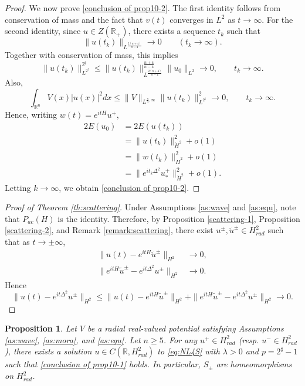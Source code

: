 \documentclass[11pt,a4paper]{article}
\numberwithin{equation}{section}
\newtheorem{proposition}[theorem]{Proposition}
\begin{document}
\begin{proof}
We now prove \eqref{conclusion of prop10-2}. The first identity follows from conservation of mass and the fact that $v(t)$ converges in $L^{2}$ as $t\to\infty$.
For the second identity, since $u \in Z(\mathbb{R}_{+})$, there exists a sequence $t_{k}$ such that
\[
\|u(t_{k})\|_{L^{\frac{2(n+4)}{n-4}}} \rightarrow 0 \qquad (t_{k} \rightarrow \infty).
\]
Together with conservation of mass, this implies
\[
 \|u(t_{k})\|_{L^{2^{\sharp}}}^{2^{\sharp}}
 \leq \|u(t_{k})\|_{L^{\frac{2(n+4)}{n-4}}}^{\frac{n+4}{n-4}}\|u_{0}\|_{L^{2}} \rightarrow 0,\qquad t_{k} \rightarrow \infty.
\]
Also,
\[
 \int_{\mathbb{R}^{n}} V(x) |u(x)|^{2} dx \leq \|V\|_{L^{\frac{n}{4}, \infty}}\|u(t_{k})\|_{L^{2^{\sharp}}}^{2} \rightarrow 0,\qquad t_{k} \rightarrow \infty.
\]
Hence, writing $w(t) = e^{itH}u^{+}$,
\begin{align*}
2E(u_{0})
&= 2E(u(t_{k})) \\
&= \|u(t_{k})\|^{2}_{\dot{H}^{2}} + o(1) \\
&= \|w(t_{k})\|^{2}_{\dot{H}^{2}} + o(1) \\
&= \|e^{it_{k}\Delta^{2}}u_{*}^{+}\|^{2}_{\dot{H}^{2}} + o(1).
\end{align*}
Letting $k \to \infty$, we obtain \eqref{conclusion of prop10-2}.
\end{proof}

\begin{proof}[Proof of Theorem \ref{th:scattering}]
Under Assumptions \ref{as:wave} and \ref{as:equ}, note that $P_{ac}(H)$ is the identity.
Therefore, by Proposition \ref{scattering-1}, Proposition \ref{scattering-2}, and Remark \ref{remark:scattering}, there exist $u^{\pm}, \tilde{u}^{\pm} \in H^{2}_{rad}$ such that as $t \to \pm \infty$,
\begin{align*}
 \|u(t) - e^{itH}\tilde{u}^{\pm}\|_{H^{2}} &\rightarrow 0, \\
 \|e^{itH}\tilde{u}^{\pm} - e^{it\Delta^{2}}u^{\pm}\|_{H^{2}} &\rightarrow 0.
\end{align*}
Hence
\[
 \|u(t) - e^{it\Delta^{2}}u^{\pm} \|_{H^{2}}
 \leq  \|u(t) - e^{itH}\tilde{u}^{\pm}\|_{H^{2}} + \|e^{itH}\tilde{u}^{\pm} - e^{it\Delta^{2}}u^{\pm}\|_{H^{2}}
 \rightarrow 0.
\]
\end{proof}

\begin{proposition}
Let $V$ be a radial real-valued potential satisfying Assumptions \ref{as:wave}, \ref{as:mora}, and \ref{as:equ}. Let $n \geq 5$.
For any $u^{+} \in H^{2}_{rad}$ (resp. $u^{-} \in H^{2}_{rad}$), there exists a solution $u \in C(\mathbb{R}, H^{2}_{rad})$ to \eqref{eq:NL4S} with $\lambda > 0$ and $p = 2^{\sharp} - 1$ such that \eqref{conclusion of prop10-1} holds.
In particular, $S_{\pm}$ are homeomorphisms on $H^{2}_{rad}$.
\end{proposition}
\end{document}
